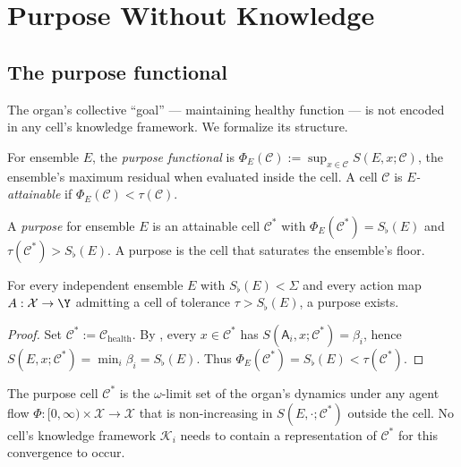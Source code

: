 \documentclass[twocolumn,11pt,a4paper]{article}
\newcommand{\Sfloor}{S_{\flat}}
\newcommand{\agent}{\mathsf{A}}
\newcommand{\Cell}{\mathcal{C}}
\newcommand{\X}{\mathcal{X}}
\newcommand{\K}{\mathcal{K}}
\begin{document}
\section{Purpose Without Knowledge}
\label{sec:purpose}

\subsection{The purpose functional}

The organ's collective ``goal'' --- maintaining healthy function --- is not
encoded in any cell's knowledge framework. We formalize its structure.

\begin{definition}\label{def:purp-func}
For ensemble $E$, the \emph{purpose functional} is
$\Phi_E(\Cell) := \sup_{x\in\Cell} S(E, x; \Cell)$,
the ensemble's maximum residual when evaluated inside the cell.
A cell $\Cell$ is \emph{$E$-attainable} if
$\Phi_E(\Cell) < \tau(\Cell)$.
\end{definition}

\begin{definition}[Purpose]\label{def:purpose}
A \emph{purpose} for ensemble $E$ is an attainable cell $\Cell^*$ with
$\Phi_E(\Cell^*) = \Sfloor(E)$ and $\tau(\Cell^*) > \Sfloor(E)$.
A purpose is the cell that saturates the ensemble's floor.
\end{definition}

\begin{theorem}\label{thm:purpose}
For every independent ensemble $E$ with $\Sfloor(E) < \Sigma$ and every
action map $A:\X\to\Y$ admitting a cell of tolerance $\tau > \Sfloor(E)$,
a purpose exists.
\end{theorem}

\begin{proof}
Set $\Cell^* := \Cell_{\mathrm{health}}$. By ,
every $x\in\Cell^*$ has $S(\agent_i, x; \Cell^*) = \beta_i$, hence
$S(E, x; \Cell^*) = \min_i \beta_i = \Sfloor(E)$. Thus
$\Phi_E(\Cell^*) = \Sfloor(E) < \tau(\Cell^*)$.
\end{proof}

\begin{theorem}\label{thm:attractor}
The purpose cell $\Cell^*$ is the $\omega$-limit set of the organ's
dynamics under any agent flow $\Phi:[0,\infty)\times\X\to\X$ that is
non-increasing in $S(E,\cdot;\Cell^*)$ outside the cell. No cell's
knowledge framework $\K_i$ needs to contain a representation of $\Cell^*$
for this convergence to occur.
\end{theorem}
\end{document}
